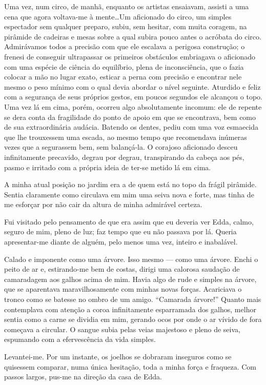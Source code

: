 Uma vez, num circo, de manhã, enquanto os artistas ensaiavam, assisti a uma cena que agora voltava-me à mente\dots Um aficionado do circo, um simples espectador sem qualquer preparo, subiu, sem hesitar, com muita coragem, na pirâmide de cadeiras e mesas sobre a qual subira pouco antes o acróbata do circo. Admirávamos todos a precisão com que ele escalava a perigosa construção; o frenesi de conseguir ultrapassar os primeiros obstáculos embriagava o aficionado com uma espécie de ciência do equilíbrio, plena de inconsciência, que o fazia colocar a mão no lugar exato, esticar a perna com precisão e encontrar nele mesmo o peso mínimo com o qual devia abordar o nível seguinte. Aturdido e feliz com a segurança de seus próprios gestos, em poucos segundos ele alcançou o topo. Uma vez lá em cima, porém, ocorreu algo absolutamente incomum: ele de repente se dera conta da fragilidade do ponto de apoio em que se encontrava, bem como de sua extraordinária audácia. Batendo os dentes, pediu com uma voz esmaecida que lhe trouxessem uma escada, ao mesmo tempo que recomendava inúmeras vezes que a segurassem bem, sem balançá-la. O corajoso aficionado desceu infinitamente precavido, degrau por degrau, transpirando da cabeça aos pés, pasmo e irritado com a própria ideia de ter-se metido lá em cima.

A minha atual posição no jardim era a de quem está no topo da frágil pirâmide. Sentia claramente como circulava em mim uma seiva nova e forte, mas tinha de me esforçar por não cair da altura de minha admirável certeza.

Fui visitado pelo pensamento de que era assim que eu deveria ver Edda, calmo, seguro de mim, pleno de luz; faz tempo que eu não passava por lá. Queria apresentar-me diante de alguém, pelo menos uma vez, inteiro e inabalável.

Calado e imponente como uma árvore. Isso mesmo --- como uma árvore. Enchi o peito de ar e, estirando-me bem de costas, dirigi uma calorosa saudação de camaradagem aos galhos acima de mim. Havia algo de rude e simples na árvore, que se aparentava maravilhosamente com minhas novas forças. Acariciava o tronco como se batesse no ombro de um amigo. ``Camarada árvore!'' Quanto mais contemplava com atenção a coroa infinitamente esparramada dos galhos, melhor sentia como a carne se dividia em mim, gerando ocos por onde o ar vívido de fora começava a circular. O sangue subia pelas veias majestoso e pleno de seiva, espumando com a efervescência da vida simples.

Levantei-me. Por um instante, os joelhos se dobraram inseguros como se quisessem comparar, numa única hesitação, toda a minha força e fraqueza. Com passos largos, pus-me na direção da casa de Edda.

